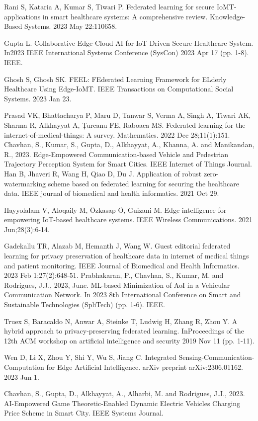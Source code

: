 \documentclass[conference]{IEEEtran}
\begin{document}
\begin{thebibliography}{1}
Rani S, Kataria A, Kumar S, Tiwari P. Federated learning for secure IoMT-applications in smart healthcare systems: A comprehensive review. Knowledge-Based Systems. 2023 May 22:110658.

Gupta L. Collaborative Edge-Cloud AI for IoT Driven Secure Healthcare System. In2023 IEEE International Systems Conference (SysCon) 2023 Apr 17 (pp. 1-8). IEEE.

Ghosh S, Ghosh SK. FEEL: FEderated Learning Framework for ELderly Healthcare Using Edge-IoMT. IEEE Transactions on Computational Social Systems. 2023 Jan 23.

Prasad VK, Bhattacharya P, Maru D, Tanwar S, Verma A, Singh A, Tiwari AK, Sharma R, Alkhayyat A, Țurcanu FE, Raboaca MS. Federated learning for the internet-of-medical-things: A survey. Mathematics. 2022 Dec 28;11(1):151.
 Chavhan, S., Kumar, S., Gupta, D., Alkhayyat, A., Khanna, A. and Manikandan, R., 2023. Edge-Empowered Communication-based Vehicle and Pedestrian Trajectory Perception System for Smart Cities. IEEE Internet of Things Journal.
Han B, Jhaveri R, Wang H, Qiao D, Du J. Application of robust zero-watermarking scheme based on federated learning for securing the healthcare data. IEEE journal of biomedical and health informatics. 2021 Oct 29.

Hayyolalam V, Aloqaily M, Özkasap Ö, Guizani M. Edge intelligence for empowering IoT-based healthcare systems. IEEE Wireless Communications. 2021 Jun;28(3):6-14.

Gadekallu TR, Alazab M, Hemanth J, Wang W. Guest editorial federated learning for privacy preservation of healthcare data in internet of medical things and patient monitoring. IEEE Journal of Biomedical and Health Informatics. 2023 Feb 1;27(2):648-51.
 Prabhakaran, P., Chavhan, S., Kumar, M. and Rodrigues, J.J., 2023, June. ML-based Minimization of AoI in a Vehicular Communication Network. In 2023 8th International Conference on Smart and Sustainable Technologies (SpliTech) (pp. 1-6). IEEE.

Truex S, Baracaldo N, Anwar A, Steinke T, Ludwig H, Zhang R, Zhou Y. A hybrid approach to privacy-preserving federated learning. InProceedings of the 12th ACM workshop on artificial intelligence and security 2019 Nov 11 (pp. 1-11).

Wen D, Li X, Zhou Y, Shi Y, Wu S, Jiang C. Integrated Sensing-Communication-Computation for Edge Artificial Intelligence. arXiv preprint arXiv:2306.01162. 2023 Jun 1.

 Chavhan, S., Gupta, D., Alkhayyat, A., Alharbi, M. and Rodrigues, J.J., 2023. AI-Empowered Game Theoretic-Enabled Dynamic Electric Vehicles Charging Price Scheme in Smart City. IEEE Systems Journal.

\end{thebibliography}
\end{document}
